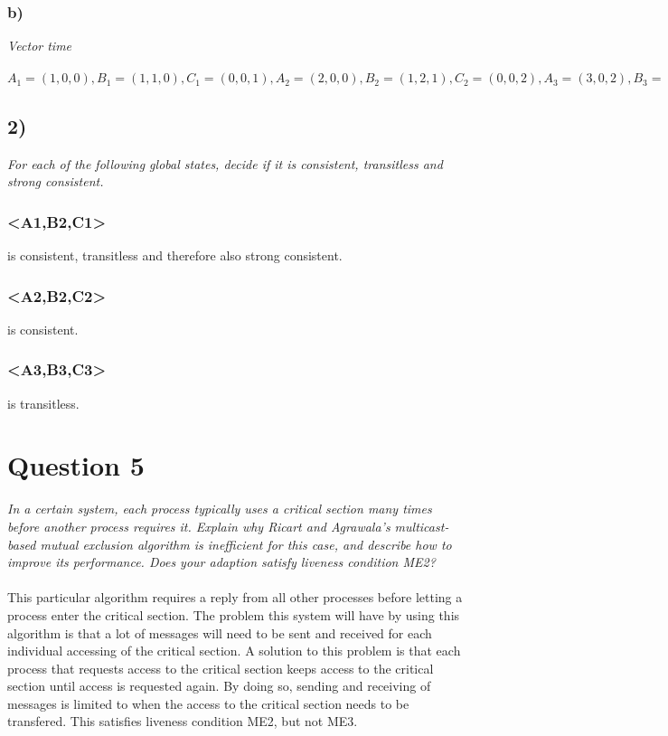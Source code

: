 \documentclass[a4paper, titlepage,12pt]{article}
\begin{document}
	\subsubsection*{b)}
	\emph{Vector time}
\\\\
	$A_1 = (1, 0, 0), B_1 = (1, 1, 0), C_1 = (0, 0, 1), A_2 = (2, 0, 0), B_2 = (1, 2, 1), C_2 = (0, 0, 2), A_3 = (3, 0, 2), B_3 = (2, 3, 1), A_4 = (4, 0, 2), C_3 = (4, 0, 3), B_4 = (2, 4, 1), C_4 = (4, 4, 4)$
	\subsection*{2)}
	\emph{For each of the following global states, decide if it is consistent, transitless and strong consistent.}
	\subsubsection*{<A1,B2,C1>} is consistent, transitless and therefore also strong consistent.
	\subsubsection*{<A2,B2,C2>} is consistent.
	\subsubsection*{<A3,B3,C3>} is transitless.

	\section*{Question 5}
	\emph{In a certain system, each process typically uses a critical section many times before another process requires it. Explain why Ricart and Agrawala's multicast-based mutual exclusion algorithm is inefficient for this case, and describe how to improve its performance. Does your adaption satisfy liveness condition ME2?}
\\\\
	This particular algorithm requires a reply from all other processes before letting a process enter the critical section. The problem this system will have by using this algorithm is that a lot of messages will need to be sent and received for each individual accessing of the critical section. A solution to this problem is that each process that requests access to the critical section keeps access to the critical section until access is requested again. By doing so, sending and receiving of messages is limited to when the access to the critical section needs to be transfered. This satisfies liveness condition ME2, but not ME3.
\end{document}
